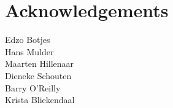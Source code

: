 {}
\chapter*{Acknowledgements}
\lipsum[1]
\bigskip

\noindent Edzo Botjes\\
Hans Mulder\\
Maarten Hillenaar\\
Dieneke Schouten\\
Barry O'Reilly\\
Krista Bliekendaal\\

